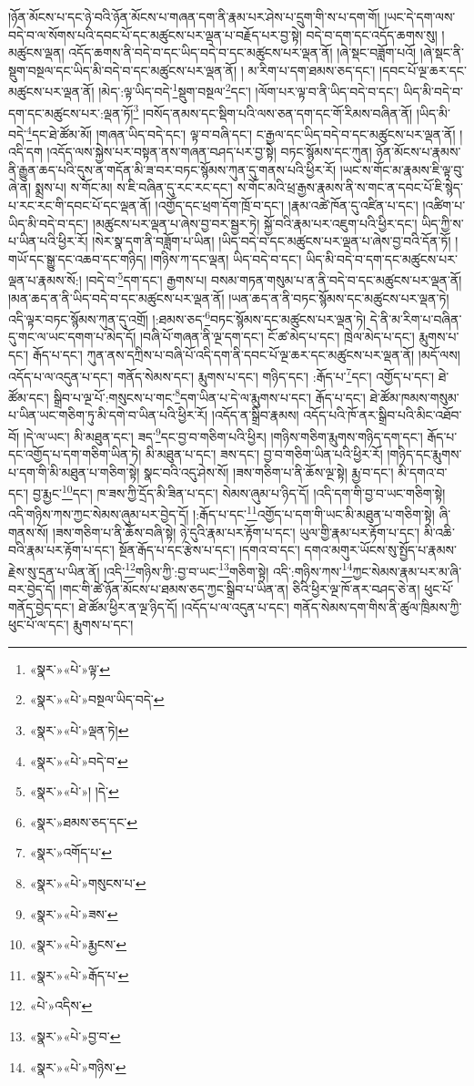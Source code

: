 །ཉོན་མོངས་པ་དང་ཉེ་བའི་ཉོན་མོངས་པ་གཞན་དག་ནི་རྣམ་པར་ཤེས་པ་དྲུག་གི་ས་པ་དག་གོ། །ཡང་དེ་དག་ལས་བདེ་བ་ལ་སོགས་པའི་དབང་པོ་དང་མཚུངས་པར་ལྡན་པ་བརྗོད་པར་བྱ་སྟེ། བདེ་བ་དག་དང་འདོད་ཆགས་སུ། །མཚུངས་ལྡན། འདོད་ཆགས་ནི་བདེ་བ་དང་ཡིད་བདེ་བ་དང་མཚུངས་པར་ལྡན་ནོ། །ཞེ་སྡང་བཟློག་པའོ། །ཞེ་སྡང་ནི་སྡུག་བསྔལ་དང་ཡིད་མི་བདེ་བ་དང་མཚུངས་པར་ལྡན་ནོ། །
མ་རིག་པ་དག་ཐམས་ཅད་དང་། །དབང་པོ་ལྔ་ཆར་དང་མཚུངས་པར་ལྡན་ནོ། །མེད་:ལྟ་ཡིད་བདེ་\footnote{«སྣར་»«པེ་»ལྟ་}སྡུག་བསྔལ་\footnote{«སྣར་»«པེ་»བསྔལ་ཡིད་བདེ་}དང་། །ལོག་པར་ལྟ་བ་ནི་ཡིད་བདེ་བ་དང་། ཡིད་མི་བདེ་བ་དག་དང་མཚུངས་པར་:ལྡན་ཏོ།\footnote{«སྣར་»«པེ་»ལྡན་ཏེ།} །བསོད་ནམས་དང་སྡིག་པའི་ལས་ཅན་དག་དང་གོ་རིམས་བཞིན་ནོ། །ཡིད་མི་བདེ་\footnote{«སྣར་»«པེ་»བདེ་བ་}དང་ཐེ་ཚོམ་མོ། །གཞན་ཡིད་བདེ་དང་། ལྟ་བ་བཞི་དང་། ང་རྒྱལ་དང་ཡིད་བདེ་བ་དང་མཚུངས་པར་ལྡན་ནོ། །འདི་དག །འདོད་ལས་སྐྱེས་པར་བསྟན་ནས་གཞན་བཤད་པར་བྱ་སྟེ། བཏང་སྙོམས་དང་ཀུན། ཉོན་མོངས་པ་རྣམས་ནི་རྒྱུན་ཆད་པའི་དུས་ན་གདོན་མི་ཟ་བར་བཏང་སྙོམས་ཀུན་དུ་གནས་པའི་ཕྱིར་རོ། །ཡང་ས་གོང་མ་རྣམས་ཇི་ལྟ་བུ་ཞེ་ན། སྨྲས་པ། ས་གོང་མ། ས་ཇི་བཞིན་དུ་རང་རང་དང་། ས་གོང་མའི་ཕྲ་རྒྱས་རྣམས་ནི་ས་གང་ན་དབང་པོ་ཇི་སྙེད་པ་རང་རང་གི་དབང་པོ་དང་ལྡན་ནོ། །འགྱོད་དང་ཕྲག་དོག་ཁྲོ་བ་དང་། །རྣམ་འཚེ་ཁོན་དུ་འཛིན་པ་དང་། །འཚིག་པ་ཡིད་མི་བདེ་བ་དང་། །མཚུངས་པར་ལྡན་པ་ཞེས་བྱ་བར་སྦྱར་ཏེ། སྐྱོ་བའི་རྣམ་པར་འཇུག་པའི་ཕྱིར་དང་། ཡིད་ཀྱི་ས་པ་ཡིན་པའི་ཕྱིར་རོ། །སེར་སྣ་དག་ནི་བཟློག་པ་ཡིན། །ཡིད་བདེ་བ་དང་མཚུངས་པར་ལྡན་པ་ཞེས་བྱ་བའི་དོན་ཏོ། །གཡོ་དང་སྒྱུ་དང་འཆབ་དང་གཉིད། །གཉིས་ཀ་དང་ལྡན། ཡིད་བདེ་བ་དང་། ཡིད་མི་བདེ་བ་དག་དང་མཚུངས་པར་ལྡན་པ་རྣམས་སོ:། །བདེ་བ་\footnote{«སྣར་»«པེ་»། །དེ་}དག་དང་། རྒྱགས་པ། བསམ་གཏན་གསུམ་པ་ན་ནི་བདེ་བ་དང་མཚུངས་པར་ལྡན་ནོ། །མན་ཆད་ན་ནི་ཡིད་བདེ་བ་དང་མཚུངས་པར་ལྡན་ནོ། །ཡན་ཆད་ན་ནི་བཏང་སྙོམས་དང་མཚུངས་པར་ལྡན་ཏེ། འདི་ལྟར་བཏང་སྙོམས་ཀུན་དུ་འགྲོ། །:ཐམས་ཅད་\footnote{«སྣར་»ཐམས་ཅད་དང་}བཏང་སྙོམས་དང་མཚུངས་པར་ལྡན་ཏེ། དེ་ནི་མ་རིག་པ་བཞིན་དུ་གང་ལ་ཡང་དགག་པ་མེད་དོ། །བཞི་པོ་གཞན་ནི་ལྔ་དག་དང་། ངོ་ཚ་མེད་པ་དང་། ཁྲེལ་མེད་པ་དང་། རྨུགས་པ་དང་། རྒོད་པ་དང་། ཀུན་ནས་དཀྲིས་པ་བཞི་པོ་འདི་དག་ནི་དབང་པོ་ལྔ་ཆར་དང་མཚུངས་པར་ལྡན་ནོ། །མདོ་ལས། འདོད་པ་ལ་འདུན་པ་དང་། གནོད་སེམས་དང་། རྨུགས་པ་དང་། གཉིད་དང་། :རྒོད་པ་\footnote{«སྣར་»འགོད་པ་}དང་། འགྱོད་པ་དང་། ཐེ་ཚོམ་དང་། སྒྲིབ་པ་ལྔ་པོ་:གསུངས་པ་གང་\footnote{«སྣར་»«པེ་»གསུངས་པ་}དག་ཡིན་པ་དེ་ལ་རྨུགས་པ་དང་། རྒོད་པ་དང་། ཐེ་ཚོམ་ཁམས་གསུམ་པ་ཡིན་ཡང་གཅིག་ཏུ་མི་དགེ་བ་ཡིན་པའི་ཕྱིར་རོ། །འདོད་ན་སྒྲིབ་རྣམས། འདོད་པའི་ཁོ་ནར་སྒྲིབ་པའི་མིང་འཐོབ་བོ། །དེ་ལ་ཡང་། མི་མཐུན་དང་། ཟད་\footnote{«སྣར་»«པེ་»ཟས་}དང་བྱ་བ་གཅིག་པའི་ཕྱིར། །གཉིས་གཅིག་རྨུགས་གཉིད་དག་དང་། རྒོད་པ་དང་འགྱོད་པ་དག་གཅིག་ཡིན་ཏེ། མི་མཐུན་པ་དང་། ཟས་དང་། བྱ་བ་གཅིག་ཡིན་པའི་ཕྱིར་རོ། །གཉིད་དང་རྨུགས་པ་དག་གི་མི་མཐུན་པ་གཅིག་སྟེ། སྣང་བའི་འདུ་ཤེས་སོ། །ཟས་གཅིག་པ་ནི་ཆོས་ལྔ་སྟེ། རྨྱ་བ་དང་། མི་དགའ་བ་དང་། བྱ་རྨྱང་\footnote{«སྣར་»«པེ་»རྨྱངས་}དང་། ཁ་ཟས་ཀྱི་དྲོད་མི་ཟིན་པ་དང་། སེམས་ཞུམ་པ་ཉིད་དོ། །འདི་དག་གི་བྱ་བ་ཡང་གཅིག་སྟེ། འདི་གཉིས་ཀས་ཀྱང་སེམས་ཞུམ་པར་བྱེད་དོ། །:རྒོད་པ་དང་\footnote{«སྣར་»«པེ་»རྒོད་པ་}འགྱོད་པ་དག་གི་ཡང་མི་མཐུན་པ་གཅིག་སྟེ། ཞི་གནས་སོ། །ཟས་གཅིག་པ་ནི་ཆོས་བཞི་སྟེ། ཉེ་དུའི་རྣམ་པར་རྟོག་པ་དང་། ཡུལ་གྱི་རྣམ་པར་རྟོག་པ་དང་། མི་འཆི་བའི་རྣམ་པར་རྟོག་པ་དང་། སྔོན་རྒོད་པ་དང་རྩེས་པ་དང་། །དགའ་བ་དང་། དགའ་མགུར་ཡོངས་སུ་སྤྱོད་པ་རྣམས་རྗེས་སུ་དྲན་པ་ཡིན་ནོ། །འདི་\footnote{«པེ་»འདིས་}གཉིས་ཀྱི་:བྱ་བ་ཡང་\footnote{«སྣར་»«པེ་»བྱ་བ་}གཅིག་སྟེ། འདི་:གཉིས་ཀས་\footnote{«སྣར་»«པེ་»གཉིས་}ཀྱང་སེམས་རྣམ་པར་མ་ཞི་བར་བྱེད་དོ། །གང་གི་ཚེ་ཉོན་མོངས་པ་ཐམས་ཅད་ཀྱང་སྒྲིབ་པ་ཡིན་ན། ཅིའི་ཕྱིར་ལྔ་ཁོ་ནར་བཤད་ཅེ་ན། ཕུང་པོ་གནོད་བྱེད་དང་། ཐེ་ཚོམ་ཕྱིར་ན་ལྔ་ཉིད་དོ། །འདོད་པ་ལ་འདུན་པ་དང་། གནོད་སེམས་དག་གིས་ནི་ཚུལ་ཁྲིམས་ཀྱི་ཕུང་པོ་ལ་དང་། རྨུགས་པ་དང་། 